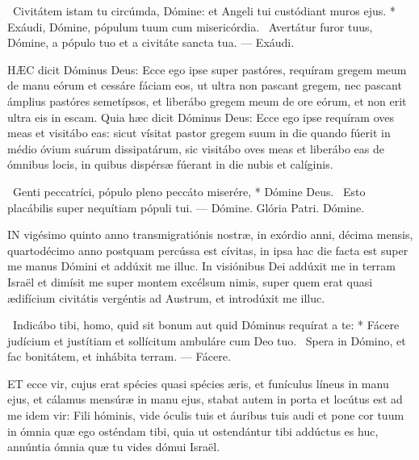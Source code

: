 \R\ Civitátem istam tu circúmda, Dómine: et Angeli tui custódiant muros ejus. * Exáudi, Dómine, pópulum tuum cum misericórdia. \V\ Avertátur furor tuus, Dómine, a pópulo tuo et a civitáte sancta tua. — Exáudi.



\lettrine[lines=2]{H}{ÆC} dicit Dóminus Deus: Ecce ego ipse super pastóres, requíram gregem meum de manu eórum et cessáre fáciam eos, ut ultra non pascant gregem, nec pascant ámplius pastóres semetípsos, et liberábo gregem meum de ore eórum, et non erit ultra eis in escam. Quia hæc dicit Dóminus Deus: Ecce ego ipse requíram oves meas et visitábo eas: sicut vísitat pastor gregem suum in die quando fúerit in médio óvium suárum dissipatárum, sic visitábo oves meas et liberábo eas de ómnibus locis, in quibus dispérsæ fúerant in die nubis et calíginis.

\R\ Genti peccatríci, pópulo pleno peccáto miserére, * Dómine Deus. \V\ Esto placábilis super nequítiam pópuli tui. — Dómine. Glória Patri. Dómine.




\lettrine[lines=2]{I}{N} vigésimo quinto anno transmigratiónis nostræ, in exórdio anni, décima mensis, quartodécimo anno postquam percússa est cívitas, in ipsa hac die facta est super me manus Dómini et addúxit me illuc. In visiónibus Dei addúxit me in terram Israël et dimísit me super montem excélsum nimis, super quem erat quasi ædifícium civitátis vergéntis ad Austrum, et introdúxit me illuc.

\R\ Indicábo tibi, homo, quid sit bonum aut quid Dóminus requírat a te: * Fácere judícium et justítiam et sollícitum ambuláre cum Deo tuo. \V\ Spera in Dómino, et fac bonitátem, et inhábita terram. — Fácere.


\lettrine[lines=2]{E}{T} ecce vir, cujus erat spécies quasi spécies æris, et funículus líneus in manu ejus, et cálamus mensúræ in manu ejus, stabat autem in porta et locútus est ad me idem vir: Fili hóminis, vide óculis tuis et áuribus tuis audi et pone cor tuum in ómnia quæ ego osténdam tibi, quia ut ostendántur tibi addúctus es huc, annúntia ómnia quæ tu vides dómui Israël.

